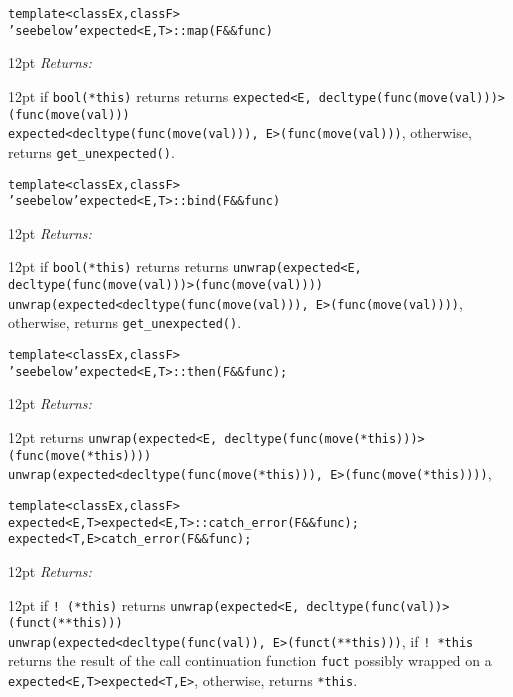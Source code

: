 \documentclass[a4paper,10pt]{article}
\newcommand{\cpp}[1]{\lstinline{#1}}
\newcommand{\wordingItem}[1]{\noindent\textit{#1:}}
\newenvironment{wordingTextItem}[1]{\wordingItem{#1}\vspace{2pt}\noindent\begin{adjustwidth}{12pt}{}}{\vspace{2pt}\end{adjustwidth}}
\newenvironment{wordingPara}{\begin{adjustwidth}{12pt}{}}{\end{adjustwidth}}
\newcommand{\suppress}[1]{\colorbox{suppress_color}{#1}}
\newcommand{\update}[1]{\colorbox{update_color}{#1}}
\begin{document}
\begin{alltt}
template <class Ex,class F>
'see below' \suppress{expected<E,T>::}map(F&& func) 
\end{alltt}
\begin{wordingPara}
\begin{wordingTextItem}{Returns}
if \cpp{bool(*this)} returns returns \suppress{\cpp{expected<E, decltype(func(move(val)))>(func(move(val)))}} \\
\update{\cpp{expected<decltype(func(move(val))), E>(func(move(val)))}}, 
otherwise, returns \cpp{get_unexpected()}.
\end{wordingTextItem}
\end{wordingPara}

\begin{alltt}
template <class Ex,class F>
'see below' \suppress{expected<E,T>::}bind(F&& func) 
\end{alltt}
\begin{wordingPara}
\begin{wordingTextItem}{Returns}
if \cpp{bool(*this)} returns returns \suppress{\cpp{unwrap(expected<E, decltype(func(move(val)))>(func(move(val))))}} \\
\update{\cpp{unwrap(expected<decltype(func(move(val))), E>(func(move(val))))}}, 
otherwise, returns \cpp{get_unexpected()}.
\end{wordingTextItem}
\end{wordingPara}

\begin{alltt}
template <class Ex,class F>
'see below' \suppress{expected<E,T>::}then(F&& func);
\end{alltt}
\begin{wordingPara}
\begin{wordingTextItem}{Returns}
returns \suppress{\cpp{unwrap(expected<E, decltype(func(move(*this)))>(func(move(*this))))}} \\
\update{\cpp{unwrap(expected<decltype(func(move(*this))), E>(func(move(*this))))}}, 
\end{wordingTextItem}
\end{wordingPara}

\begin{alltt}
template <class Ex,class F>
\suppress{expected<E,T> expected<E,T>::catch_error(F&& func);}
\update{expected<T,E> catch_error(F&& func);}
\end{alltt}
\begin{wordingPara}
\begin{wordingTextItem}{Returns}
if \cpp{! (*this)} returns \suppress{\cpp{unwrap(expected<E, decltype(func(val))>(funct(**this)))}} \\
\update{\cpp{unwrap(expected<decltype(func(val)), E>(funct(**this)))}}, 
if \cpp{! *this} returns the result of the call continuation function \cpp{fuct} possibly wrapped on a \suppress{\cpp{expected<E,T>}}\update{\cpp{expected<T,E>}}, 
otherwise, returns \cpp{*this}.
\end{wordingTextItem}
\end{wordingPara}
\end{document}
